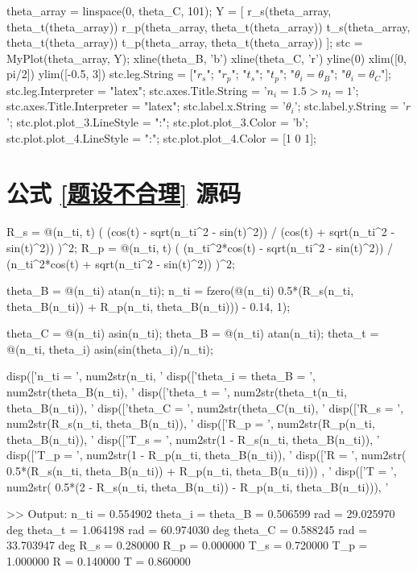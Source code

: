 \documentclass[UTF8]{report}
\theoremstyle{MyLineTheoremStyle} %
\theoremstyle{MyBlockTheoremStyle} %
\theoremstyle{MySubsubsectionStyle} %
\begin{document}
\begin{matlablisting}
theta_array = linspace(0, theta_C, 101);
Y = [
    r_s(theta_array, theta_t(theta_array))
    r_p(theta_array, theta_t(theta_array))
    t_s(theta_array, theta_t(theta_array))
    t_p(theta_array, theta_t(theta_array))
    ];
stc = MyPlot(theta_array, Y);
xline(theta_B, 'b')
xline(theta_C, 'r')
yline(0)
xlim([0, pi/2])
ylim([-0.5, 3])
stc.leg.String = ["$r_s$"; "$r_p$"; "$t_s$"; "$t_p$"; "$\theta_i = \theta_B$"; "$\theta_i = \theta_C$"];
stc.leg.Interpreter = "latex";
stc.axes.Title.String = '$n_i = 1.5 > n_t = 1$';
stc.axes.Title.Interpreter = "latex";
stc.label.x.String = '$\theta_i$';
stc.label.y.String = '$r$';
stc.plot.plot_3.LineStyle = ":";
stc.plot.plot_3.Color = 'b';
stc.plot.plot_4.LineStyle = ":";
stc.plot.plot_4.Color = [1 0 1];
\end{matlablisting}

\section{公式 \ref{题设不合理} 源码}\label{题设不合理源码}

\begin{matlablisting}
R_s = @(n_ti, t) ( (cos(t) - sqrt(n_ti^2 - sin(t)^2)) / (cos(t) + sqrt(n_ti^2 - sin(t)^2)) )^2;
R_p = @(n_ti, t) ( (n_ti^2*cos(t) - sqrt(n_ti^2 - sin(t)^2)) / (n_ti^2*cos(t) + sqrt(n_ti^2 - sin(t)^2)) )^2;

theta_B = @(n_ti) atan(n_ti);
n_ti = fzero(@(n_ti) 0.5*(R_s(n_ti, theta_B(n_ti)) + R_p(n_ti, theta_B(n_ti))) - 0.14, 1);

theta_C = @(n_ti) asin(n_ti);
theta_B = @(n_ti) atan(n_ti);
theta_t = @(n_ti, theta_i) asin(sin(theta_i)/n_ti);

disp(['n_ti = ', num2str(n_ti, '%
disp(['theta_i = theta_B = ', num2str(theta_B(n_ti), '%
disp(['theta_t = ', num2str(theta_t(n_ti, theta_B(n_ti)), '%
disp(['theta_C = ', num2str(theta_C(n_ti), '%
disp(['R_s = ', num2str(R_s(n_ti, theta_B(n_ti)), '%
disp(['R_p = ', num2str(R_p(n_ti, theta_B(n_ti)), '%
disp(['T_s = ', num2str(1 - R_s(n_ti, theta_B(n_ti)), '%
disp(['T_p = ', num2str(1 - R_p(n_ti, theta_B(n_ti)), '%
disp(['R = ', num2str( 0.5*(R_s(n_ti, theta_B(n_ti)) + R_p(n_ti, theta_B(n_ti))) , '%
disp(['T = ', num2str( 0.5*(2 - R_s(n_ti, theta_B(n_ti)) - R_p(n_ti, theta_B(n_ti))), '%


>> Output:
n_ti = 0.554902
theta_i = theta_B = 0.506599 rad = 29.025970 deg
theta_t = 1.064198 rad = 60.974030 deg
theta_C = 0.588245 rad = 33.703947 deg
R_s = 0.280000
R_p = 0.000000
T_s = 0.720000
T_p = 1.000000
R = 0.140000
T = 0.860000
\end{matlablisting}
\end{document}
